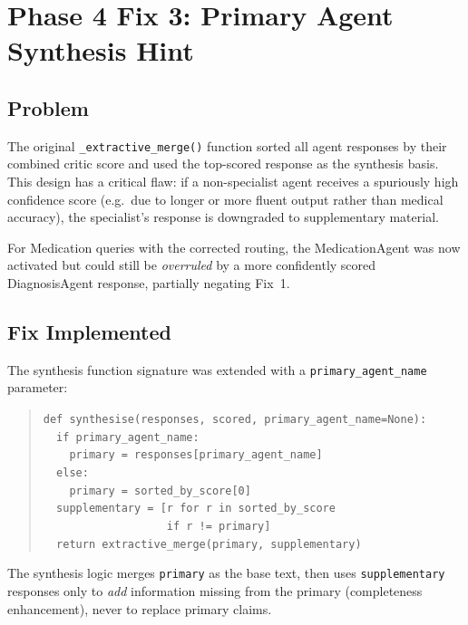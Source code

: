 \documentclass[a4paper,12pt]{article}
\begin{document}
\section{Phase 4 Fix 3: Primary Agent Synthesis Hint}

\subsection{Problem}

The original \texttt{\_extractive\_merge()} function sorted all agent
responses by their combined critic score and used the top-scored response
as the synthesis basis. This design has a critical flaw: if a non-specialist
agent receives a spuriously high confidence score (e.g.\ due to longer
or more fluent output rather than medical accuracy), the specialist's
response is downgraded to supplementary material.

For Medication queries with the corrected routing, the MedicationAgent
was now activated but could still be \emph{overruled} by a more
confidently scored DiagnosisAgent response, partially negating Fix~1.

\subsection{Fix Implemented}

The synthesis function signature was extended with a
\texttt{primary\_agent\_name} parameter:
\begin{quote}\small
\texttt{def synthesise(responses, scored, primary\_agent\_name=None):}\\
\texttt{\ \ if primary\_agent\_name:}\\
\texttt{\ \ \ \ primary = responses[primary\_agent\_name]}\\
\texttt{\ \ else:}\\
\texttt{\ \ \ \ primary = sorted\_by\_score[0]}\\
\texttt{\ \ supplementary = [r for r in sorted\_by\_score}\\
\texttt{\ \ \ \ \ \ \ \ \ \ \ \ \ \ \ \ \ \ \ if r != primary]}\\
\texttt{\ \ return extractive\_merge(primary, supplementary)}
\end{quote}

The synthesis logic merges \texttt{primary} as the base text, then uses
\texttt{supplementary} responses only to \emph{add} information missing
from the primary (completeness enhancement), never to replace primary
claims.
\end{document}
